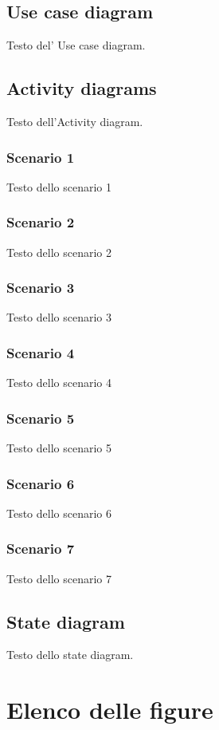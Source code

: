 \documentclass[12pt]{article}
\begin{document}
\subsection{Use case diagram}
Testo del' Use case diagram.

\subsection{Activity diagrams}
Testo dell'Activity diagram.
\subsubsection{Scenario 1}
Testo dello scenario 1
\subsubsection{Scenario 2}
Testo dello scenario 2
\subsubsection{Scenario 3}
Testo dello scenario 3
\subsubsection{Scenario 4}
Testo dello scenario 4
\subsubsection{Scenario 5}
Testo dello scenario 5
\subsubsection{Scenario 6}
Testo dello scenario 6
\subsubsection{Scenario 7}
Testo dello scenario 7

\subsection{State diagram}
Testo dello state diagram.

\section*{Elenco delle figure}
\end{document}
